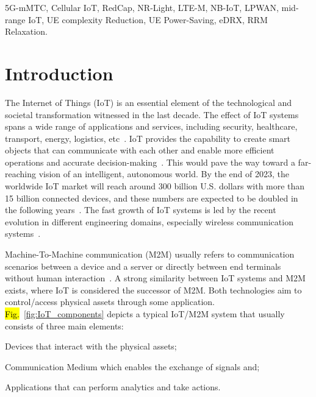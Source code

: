 \documentclass[]{IEEEtran}
\begin{document}
\begin{IEEEkeywords}
5G-mMTC, Cellular IoT, RedCap, NR-Light, LTE-M, NB-IoT, LPWAN, mid-range IoT, UE complexity Reduction, UE Power-Saving, eDRX, RRM Relaxation.
\end{IEEEkeywords}



\section{Introduction}
\label{sec:1-Inro}









The Internet of Things (IoT) is an essential element of the technological and societal transformation witnessed in the last decade.
The effect of IoT systems spans a wide range of applications and services, including security, healthcare, transport, energy, logistics, etc~\cite{andreev2015understanding}.
IoT provides the capability to create smart objects that can communicate with each other and enable more efficient operations and accurate decision-making~\cite{itu-t_overview_2012_Y.2060}.
This would pave the way toward a far-reaching vision of an intelligent, autonomous world.
By the end of 2023, the worldwide IoT market will reach around 300 billion U.S. dollars with more than 15 billion connected devices, and these numbers are expected to be doubled in the following years~\cite{transforma_insights_current_nodate}.
The fast growth of IoT systems is led by the recent evolution in different engineering domains, especially wireless communication systems~\cite{chettri_comprehensive_2020_1}.

Machine-To-Machine communication (M2M) usually refers to communication scenarios between a device and a server or directly between end terminals without human interaction~\cite{herrero_fundamentals_2021}.
A strong similarity between IoT systems and M2M exists, where IoT is considered the successor of M2M.
Both technologies aim to control/access physical assets through some application. \hl{Fig.}~\ref{fig:IoT_components} depicts a typical IoT/M2M system that usually consists of three main elements: \begin{enumerate*}
    \item Devices that interact with the physical assets;
    \item Communication Medium which enables the exchange of signals and;
    \item Applications that can perform analytics and take actions.
\end{enumerate*}
\end{document}
